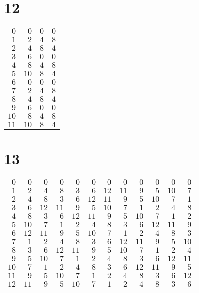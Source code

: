 \documentclass[a4paper]{scrartcl}
\begin{document}
\section*{12}
\begin{tabular}{rrrr}
\toprule
$0$ & $0$ & $0$ & $0$ \\
$1$ & $2$ & $4$ & $8$ \\
$2$ & $4$ & $8$ & $4$ \\
$3$ & $6$ & $0$ & $0$ \\
$4$ & $8$ & $4$ & $8$ \\
$5$ & $10$ & $8$ & $4$ \\
$6$ & $0$ & $0$ & $0$ \\
$7$ & $2$ & $4$ & $8$ \\
$8$ & $4$ & $8$ & $4$ \\
$9$ & $6$ & $0$ & $0$ \\
$10$ & $8$ & $4$ & $8$ \\
$11$ & $10$ & $8$ & $4$ \\
\bottomrule
\end{tabular}

\section*{13}
\begin{tabular}{rrrrrrrrrrrr}
\toprule
$0$ & $0$ & $0$ & $0$ & $0$ & $0$ & $0$ & $0$ & $0$ & $0$ & $0$ & $0$ \\
$1$ & $2$ & $4$ & $8$ & $3$ & $6$ & $12$ & $11$ & $9$ & $5$ & $10$ & $7$ \\
$2$ & $4$ & $8$ & $3$ & $6$ & $12$ & $11$ & $9$ & $5$ & $10$ & $7$ & $1$ \\
$3$ & $6$ & $12$ & $11$ & $9$ & $5$ & $10$ & $7$ & $1$ & $2$ & $4$ & $8$ \\
$4$ & $8$ & $3$ & $6$ & $12$ & $11$ & $9$ & $5$ & $10$ & $7$ & $1$ & $2$ \\
$5$ & $10$ & $7$ & $1$ & $2$ & $4$ & $8$ & $3$ & $6$ & $12$ & $11$ & $9$ \\
$6$ & $12$ & $11$ & $9$ & $5$ & $10$ & $7$ & $1$ & $2$ & $4$ & $8$ & $3$ \\
$7$ & $1$ & $2$ & $4$ & $8$ & $3$ & $6$ & $12$ & $11$ & $9$ & $5$ & $10$ \\
$8$ & $3$ & $6$ & $12$ & $11$ & $9$ & $5$ & $10$ & $7$ & $1$ & $2$ & $4$ \\
$9$ & $5$ & $10$ & $7$ & $1$ & $2$ & $4$ & $8$ & $3$ & $6$ & $12$ & $11$ \\
$10$ & $7$ & $1$ & $2$ & $4$ & $8$ & $3$ & $6$ & $12$ & $11$ & $9$ & $5$ \\
$11$ & $9$ & $5$ & $10$ & $7$ & $1$ & $2$ & $4$ & $8$ & $3$ & $6$ & $12$ \\
$12$ & $11$ & $9$ & $5$ & $10$ & $7$ & $1$ & $2$ & $4$ & $8$ & $3$ & $6$ \\
\bottomrule
\end{tabular}
\end{document}
